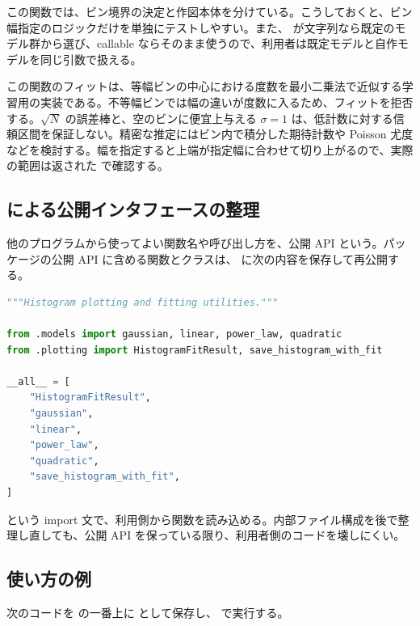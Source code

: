 この関数では、ビン境界の決定と作図本体を分けている。こうしておくと、ビン幅指定のロジックだけを単独にテストしやすい。また、 が文字列なら既定のモデル群から選び、callable ならそのまま使うので、利用者は既定モデルと自作モデルを同じ引数で扱える。

この関数のフィットは、等幅ビンの中心における度数を最小二乗法で近似する学習用の実装である。不等幅ビンでは幅の違いが度数に入るため、フィットを拒否する。\(\sqrt{N}\) の誤差棒と、空のビンに便宜上与える \(\sigma=1\) は、低計数に対する信頼区間を保証しない。精密な推定にはビン内で積分した期待計数や Poisson 尤度などを検討する。幅を指定すると上端が指定幅に合わせて切り上がるので、実際の範囲は返された  で確認する。

\subsection{ による公開インタフェースの整理}

他のプログラムから使ってよい関数名や呼び出し方を、公開 API という。パッケージの公開 API に含める関数とクラスは、 に次の内容を保存して再公開する。

\begin{lstlisting}[language=Python, title={src/histfit\_tools/\_\_init\_\_.py}]
"""Histogram plotting and fitting utilities."""

from .models import gaussian, linear, power_law, quadratic
from .plotting import HistogramFitResult, save_histogram_with_fit

__all__ = [
    "HistogramFitResult",
    "gaussian",
    "linear",
    "power_law",
    "quadratic",
    "save_histogram_with_fit",
]
\end{lstlisting}

 という import 文で、利用側から関数を読み込める。内部ファイル構成を後で整理し直しても、公開 API を保っている限り、利用者側のコードを壊しにくい。

\subsection{使い方の例}

次のコードを  の一番上に  として保存し、 で実行する。

